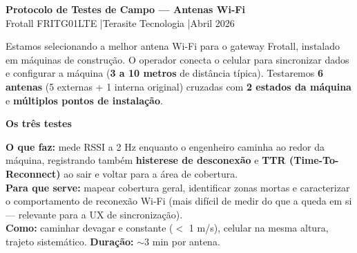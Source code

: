 \documentclass[a4paper,10pt]{article}
\begin{document}
\pagestyle{empty}
\setlength{\parskip}{0pt}


\begin{tcolorbox}[
  enhanced, arc=5pt, boxrule=0pt,
  left=12pt, right=12pt, top=8pt, bottom=8pt,
  interior style={left color=tsazul, right color=tsteal},
  colframe=tsazul,
]
  \color{white}
  {\large\bfseries Protocolo de Testes de Campo --- Antenas Wi-Fi}\\[2pt]
  {\small Frotall FRITG01LTE \quad|\quad Terasite Tecnologia \quad|\quad Abril 2026}
\end{tcolorbox}

\vspace{4pt}

\begin{tcolorbox}[cxa, title={Contexto}]
\small
Estamos selecionando a melhor antena Wi-Fi para o gateway Frotall, instalado em
máquinas de construção. O operador conecta o celular para sincronizar dados e
configurar a máquina (\textbf{3 a 10 metros} de distância típica).
Testaremos \textbf{6 antenas} (5 externas + 1 interna original) cruzadas com
\textbf{2 estados da máquina} e \textbf{múltiplos pontos de instalação}.
\end{tcolorbox}

\vspace{4pt}
\begin{center}
{\normalsize\bfseries\color{tsazul} Os três testes}
\end{center}
\vspace{2pt}

\begin{tcolorbox}[cxv, title={Teste 1 --- WALK (Varredura dinâmica + TTR)}]
\small
\textbf{O que faz:} mede RSSI a 2 Hz enquanto o engenheiro caminha ao redor da
máquina, registrando também \textbf{histerese de desconexão} e \textbf{TTR
(Time-To-Reconnect)} ao sair e voltar para a área de cobertura.\\[2pt]
\textbf{Para que serve:} mapear cobertura geral, identificar zonas mortas e
caracterizar o comportamento de reconexão Wi-Fi (mais difícil de medir do que a
queda em si --- relevante para a UX de sincronização).\\[2pt]
\textbf{Como:} caminhar devagar e constante ($<$ 1 m/s), celular na mesma altura,
trajeto sistemático. \textbf{Duração:} $\sim$3 min por antena.
\end{tcolorbox}
\end{document}
